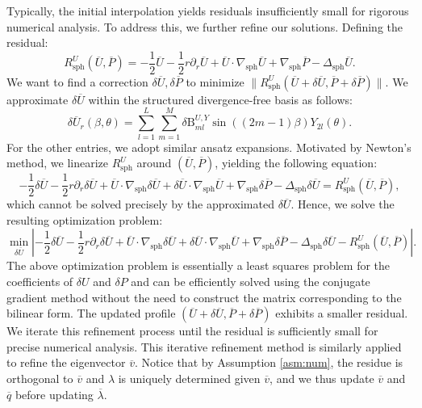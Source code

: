 \documentclass[11pt,a4paper]{article}
\numberwithin{equation}{section}
\newcommand{\Beta}{\mathrm{B}}
\newcommand{\tmop}[1]{\ensuremath{\operatorname{#1}}}
\begin{document}
Typically, the initial interpolation yields residuals insufficiently small for
rigorous numerical analysis. To address this, we further refine our solutions.
Defining the residual:
\[ R_{\tmop{sph}}^U  (\overline{U}, \overline{P}) = - \frac{1}{2}  \overline{U} - \frac{1}{2}
   r \partial_r  \overline{U} + \overline{U} \cdot \nabla_{\tmop{sph}}  \overline{U} +
   \nabla_{\tmop{sph}}  \overline{P} - \Delta_{\tmop{sph}}  \overline{U} . \]
We want to find a correction $\delta \overline{U}, \delta \overline{P}$ to minimize
$\|R_{\tmop{sph}}^U (\overline{U} + \delta \overline{U}, \overline{P} + \delta \overline{P})\|$.
We approximate $\delta \overline{U}$ within the structured divergence-free basis as
follows:
\begin{equation}
  \delta \overline{U}_r (\beta, \theta) = \sum_{l = 1}^L \sum_{m = 1}^M \delta
  \Beta^{U, Y}_{ml} \sin ((2 m - 1) \beta) Y_{2 l} (\theta) . \label{eq:delta
  U ansatz}
\end{equation}
For the other entries, we adopt similar ansatz expansions. Motivated by
Newton's method, we linearize $R_{\tmop{sph}}^U$ around $(\overline{U}, \overline{P})$,
yielding the following equation:
\begin{equation}
  - \frac{1}{2} \delta \overline{U} - \frac{1}{2} r \partial_r \delta \overline{U} +
  \overline{U} \cdot \nabla_{\tmop{sph}} \delta \overline{U} + \delta \overline{U} \cdot
  \nabla_{\tmop{sph}}  \overline{U} + \nabla_{\tmop{sph}} \delta \overline{P} -
  \Delta_{\tmop{sph}} \delta \overline{U} = R_{\tmop{sph}}^U  (\overline{U}, \overline{P}),
  \label{eq:delta U eq}
\end{equation}
which cannot be solved precisely by the approximated $\delta \overline{U}$. Hence,
we solve the resulting optimization problem:
\begin{equation}
  \min_{\delta \overline{U}} \left| - \frac{1}{2} \delta \overline{U} - \frac{1}{2} r
  \partial_r \delta \overline{U} + \overline{U} \cdot \nabla_{\tmop{sph}} \delta \overline{U}
  + \delta \overline{U} \cdot \nabla_{\tmop{sph}}  \overline{U} + \nabla_{\tmop{sph}}
  \delta \overline{P} - \Delta_{\tmop{sph}} \delta \overline{U} - R_{\tmop{sph}}^U
  (\overline{U}, \overline{P}) \right| . \label{eq:min pb}
\end{equation}
The above optimization problem is essentially a least squares problem for the
coefficients of $\delta U$ and $\delta P$ and can be efficiently solved using
the conjugate gradient method without the need to construct the matrix
corresponding to the bilinear form. The updated profile $(\overline{U} + \delta
\overline{U}, \overline{P} + \delta \overline{P})$ exhibits a smaller residual. We iterate
this refinement process until the residual is sufficiently small for precise
numerical analysis. This iterative refinement method is similarly applied to
refine the eigenvector $\overline{v}$. Notice that by Assumption \ref{asm:num}, the
residue is orthogonal to $\overline{v}$ and $\lambda$ is uniquely determined given
$\overline{v}$, and we thus update $\overline{v}$ and $\overline{q}$ before updating
$\overline{\lambda}$.
\end{document}
